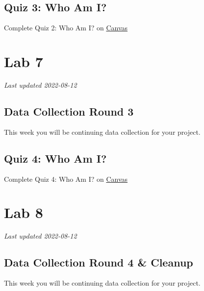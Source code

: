 \documentclass[
]{book}
\begin{document}
\hypertarget{quiz-3-who-am-i}{%
\chapter*{Quiz 3: Who Am I?}\label{quiz-3-who-am-i}}

Complete Quiz 2: Who Am I? on \href{https://canvas.ubc.ca/courses/113910}{Canvas}

\hypertarget{part-lab-7}{%
\part*{Lab 7}\label{part-lab-7}}

\emph{Last updated 2022-08-12}

\hypertarget{data-collection-round-3}{%
\chapter*{Data Collection Round 3}\label{data-collection-round-3}}

This week you will be continuing data collection for your project.

\hypertarget{quiz-4-who-am-i}{%
\chapter*{Quiz 4: Who Am I?}\label{quiz-4-who-am-i}}

Complete Quiz 4: Who Am I? on \href{https://canvas.ubc.ca/courses/113910}{Canvas}

\hypertarget{part-lab-8}{%
\part*{Lab 8}\label{part-lab-8}}

\emph{Last updated 2022-08-12}

\hypertarget{data-collection-round-4-cleanup}{%
\chapter*{Data Collection Round 4 \& Cleanup}\label{data-collection-round-4-cleanup}}

This week you will be continuing data collection for your project.
\end{document}

